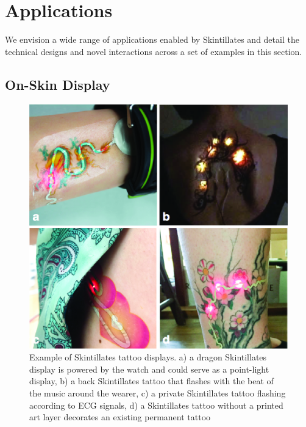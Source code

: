 \documentclass{sigchi}
\begin{document}
\section{Applications}
We envision a wide range of applications enabled by Skintillates and detail the technical designs and novel interactions across a set of examples in this section.
\subsection{On-Skin Display}
\begin{figure}[!b]
\centering
\includegraphics[width=1\columnwidth]{figures/Figure6}
\caption{Example of Skintillates tattoo displays. a) a dragon Skintillates display is powered by the watch and could serve as a point-light display, b) a back Skintillates tattoo that flashes with the beat of the music around the wearer, c) a private Skintillates tattoo flashing according to ECG signals, d) a Skintillates tattoo without a printed art layer decorates an existing permanent tattoo}
\vspace{-8pt}
\label{fig:displays}
\end{figure}
\end{document}
